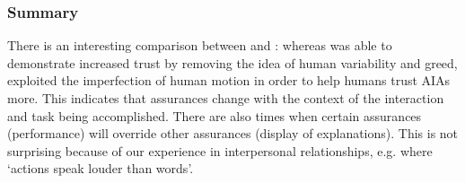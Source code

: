 \subsubsection{Summary}
There is an interesting comparison between \cite{Wu2016-ei} and \cite{Dragan2013-wd}: whereas \cite{Wu2016-ei} was able to demonstrate increased trust by removing the idea of human variability and greed, \cite{Dragan2013-wd} exploited the imperfection of human motion in order to help humans trust AIAs more. This indicates that  assurances change with the context of the interaction and task being accomplished. There are also times when certain assurances (performance) will override other assurances (display of explanations). This is not surprising because of our experience in interpersonal relationships, e.g. where `actions speak louder than words'. 
